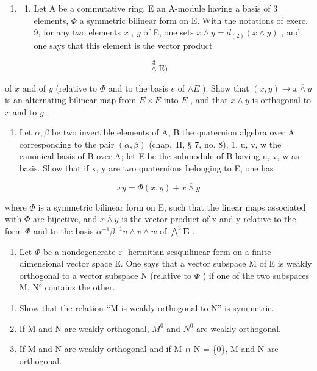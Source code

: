 \begin{enumerate}
\def\labelenumi{\arabic{enumi})}
\setcounter{enumi}{9}
\tightlist
\item
  \begin{enumerate}
  \def\labelenumii{\alph{enumii})}
  \tightlist
  \item
    Let A be a commutative ring, E an A-module having a basis of 3 elements, \(\Phi\) a symmetric bilinear form on E. With the notations of exerc. 9, for any two elements \(x\) , \(y\) of E, one sets \(x \overline{\wedge} y = d_{(2)}(x \wedge y)\) , and one says that this element is the vector product
  \end{enumerate}
\end{enumerate}

\[
\stackrel {{3}} {\wedge} \mathrm{E})
\]

of \(x\) and of \(y\) (relative to \(\Phi\) and to the basis \(e\) of \(\wedge E\) ). Show that \((x, y) \to x \overline{\wedge} y\) is an alternating bilinear map from \(E \times E\) into \(E\) , and that \(x \overline{\wedge} y\) is orthogonal to \(x\) and to \(y\) .

\begin{enumerate}
\def\labelenumi{\alph{enumi})}
\setcounter{enumi}{1}
\tightlist
\item
  Let \(\alpha, \beta\) be two invertible elements of A, B the quaternion algebra over A corresponding to the pair \((\alpha, \beta)\) (chap.~II, § 7, no. 8), 1, u, v, w the canonical basis of B over A; let E be the submodule of B having u, v, w as basis. Show that if x, y are two quaternions belonging to E, one has
\end{enumerate}

\[
x y = \Phi (x, y) + x \overline {{{{\wedge}}}} y
\]

where \(\Phi\) is a symmetric bilinear form on E, such that the linear maps associated with \(\Phi\) are bijective, and \(x\overline{\wedge}y\) is the vector product of x and y relative to the form \(\Phi\) and to the basis \(\alpha^{-1}\beta^{-1}u\wedge v\wedge w\) of \(\bigwedge^{3}\mathbf{E}\) .

\begin{enumerate}
\def\labelenumi{\arabic{enumi})}
\setcounter{enumi}{10}
\tightlist
\item
  Let \(\Phi\) be a nondegenerate \(\varepsilon\) -hermitian sesquilinear form on a finite-dimensional vector space E. One says that a vector subspace M of E is weakly orthogonal to a vector subspace N (relative to \(\Phi\) ) if one of the two subspaces M, N° contains the other.
\end{enumerate}

\begin{enumerate}
\def\labelenumi{\alph{enumi})}
\item
  Show that the relation “M is weakly orthogonal to N” is symmetric.
\item
  If M and N are weakly orthogonal, \(M^{0}\) and \(N^{0}\) are weakly orthogonal.
\item
  If M and N are weakly orthogonal and if M ∩ N = \{0\}, M and N are orthogonal.
\end{enumerate}

